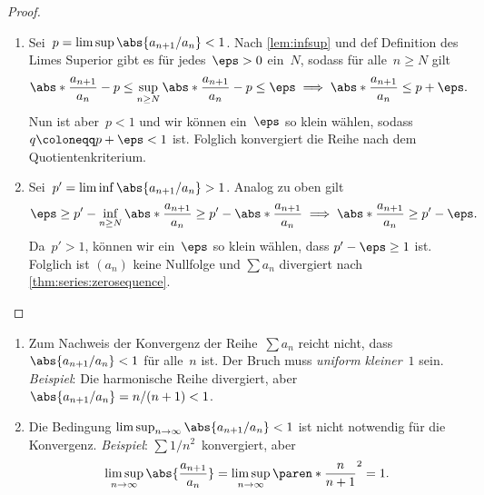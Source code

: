 \documentclass[a4paper]{article}
\begin{document}
\begin{proof}\leavevmode
    \begin{enumerate}
        \item Sei~$p = \limsup \abs{a_{n+1}/a_n} < 1$. Nach \cref{lem:infsup} und def Definition des Limes Superior gibt es für jedes~$\eps > 0$ ein~$N$, sodass für alle~$n \geq N$ gilt
              \begin{equation*}
                  \abs*{\frac{a_{n+1}}{a_n}} - p \leq \sup_{n \geq N}\abs*{\frac{a_{n+1}}{a_n}} - p \leq \eps \implies \abs*{\frac{a_{n+1}}{a_n}} \leq p + \eps.
              \end{equation*}
              Nun ist aber~$p < 1$ und wir können ein~$\eps$ so klein wählen, sodass $q \coloneqq p+\eps  < 1$ ist. Folglich konvergiert die Reihe nach dem Quotientenkriterium.
        \item Sei~$p' = \liminf \abs{a_{n+1}/a_n} > 1$. Analog zu oben gilt
              \begin{equation*}
                  \eps \geq p' - \inf_{n\geq N}\abs*{\frac{a_{n+1}}{a_n}} \geq p' - \abs*{\frac{a_{n+1}}{a_n}} \implies \abs*{\frac{a_{n+1}}{a_n}} \geq p' - \eps.
              \end{equation*}
              Da~$p' > 1$, können wir ein~$\eps$ so klein wählen, dass $p'-\eps \geq 1$ ist. Folglich ist $(a_n)$ keine Nullfolge und $\sum a_n$ divergiert nach \cref{thm:series:zerosequence}.\qedhere
    \end{enumerate}
\end{proof}

\begin{remark}\leavevmode
    \begin{enumerate}
        \item Zum Nachweis der Konvergenz der Reihe~$\sum a_n$ reicht nicht, dass $\abs{a_{n+1}/a_n} < 1$ für alle~$n$ ist. Der Bruch muss \emph{uniform kleiner}~$1$ sein. \emph{Beispiel}: Die harmonische Reihe divergiert, aber $\abs{a_{n+1}/a_n} = n/(n+1) < 1$.
        \item Die Bedingung $\limsup_{n\to\infty} \abs{a_{n+1}/a_n} < 1$ ist nicht notwendig für die Konvergenz. \emph{Beispiel}: $\sum 1/n^2$~konvergiert, aber
              \begin{equation*}
                  \limsup_{n\to\infty} \abs{\frac{a_{n+1}}{a_n}} = \limsup_{n\to\infty} \paren*{\frac{n}{n+1}}^2 = 1.
              \end{equation*}
    \end{enumerate}
\end{remark}
\end{document}
